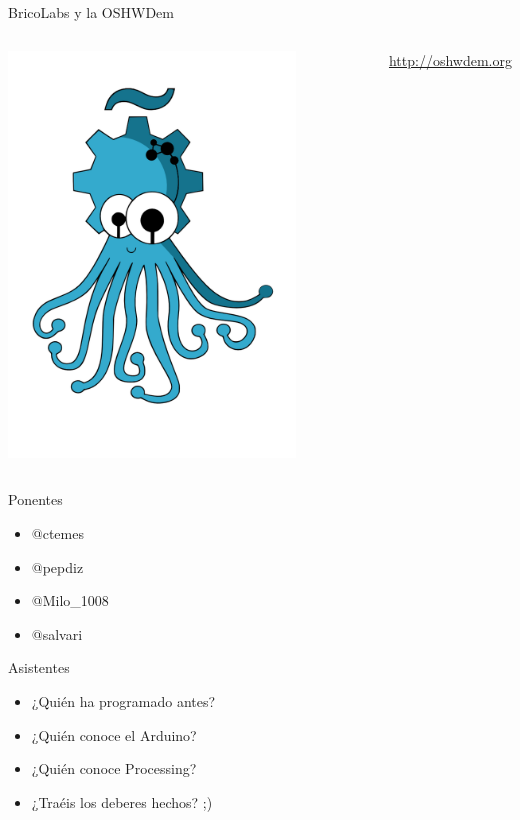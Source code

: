 \begin{frame}{BricoLabs y la OSHWDem}
\begin{columns}
    \includegraphics [width=0.8\textwidth]{oshwi.png}

    \url{http://oshwdem.org}
  \end{columns}
\end{frame}

\begin{frame}{Ponentes}
  \begin{itemize}
  \item @ctemes
  \item @pepdiz
  \item @Milo\_1008
  \item @salvari
  \end{itemize}
\end{frame}

\begin{frame}{Asistentes}
  \begin{itemize}
  \item ¿Quién ha programado antes?
    \pause
  \item ¿Quién conoce el Arduino?
    \pause
  \item ¿Quién conoce Processing?
    \pause
  \item ¿Traéis los deberes hechos? ;)
  \end{itemize}
\end{frame}

